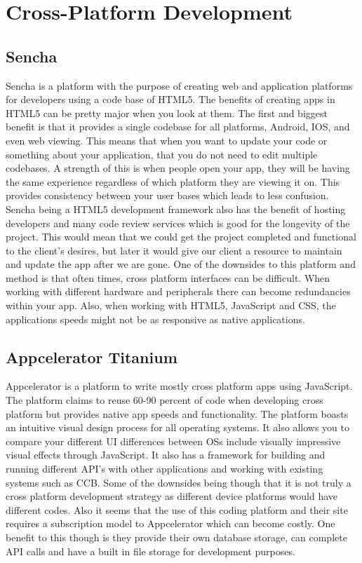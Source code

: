 \documentclass[letterpaper,10pt,draftclsnofoot,onecolumn,titlepage]{IEEEtran}
\begin{document}
	\section{Cross-Platform Development}
	\subsection{Sencha}
		Sencha is a platform with the purpose of creating web and application platforms for developers using a code base of HTML5. The benefits of creating apps in HTML5 can be pretty major when you look at them. The first and biggest benefit is that it provides a single codebase for all platforms, Android, IOS, and even web viewing. This means that when you want to update your code or something about your application, that you do not need to edit multiple codebases. A strength of this is when people open your app, they will be having the same experience regardless of which platform they are viewing it on. This provides consistency between your user bases which leads to less confusion. Sencha being a HTML5 development framework also has the benefit of hosting developers and many code review services which is good for the longevity of the project. This would mean that we could get the project completed and functional to the client’s desires, but later it would give our client a resource to maintain and update the app after we are gone. One of the downsides to this platform and method is that often times, cross platform interfaces can be difficult. When working with different hardware and peripherals there can become redundancies within your app. Also, when working with HTML5, JavaScript and CSS, the applications speeds might not be as responsive as native applications.
	\subsection{Appcelerator Titanium}
		Appcelerator is a platform to write mostly cross platform apps using JavaScript. The platform claims to reuse 60-90 percent of code when developing cross platform but provides native app speeds and functionality. The platform boasts an intuitive visual design process for all operating systems. It also allows you to compare your different UI differences between OSs include visually impressive visual effects through JavaScript.  It also has a framework for building and running different API’s with other applications and working with existing systems such as CCB. Some of the downsides being though that it is not truly a cross platform development strategy as different device platforms would have different codes. Also it seems that the use of this coding platform and their site requires a subscription model to Appcelerator which can become costly. One benefit to this though is they provide their own database storage, can complete API calls and have a built in file storage for development purposes.
\end{document}
